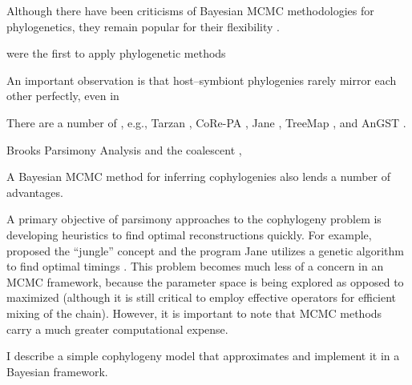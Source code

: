\documentclass[12pt,letterpaper]{article}
\begin{document}
Although there have been criticisms of Bayesian \ac{MCMC} methodologies \parencites{Felsenstein:2005}{Kolaczkowski:2009} for phylogenetics, they remain popular for their flexibility  \parencites{Huelsenbeck:2000}{Ronquist:2012}.

\textcite{Haffner:1988} were the first to apply phylogenetic methods  

An important observation is that host--symbiont phylogenies rarely mirror each other perfectly, even in 

There are a number of , e.g., Tarzan \parencite{Merkle:2005}, CoRe-PA \parencite{Merkle:2010}, Jane \parencite{Conow:2010}, TreeMap \parencite{Charleston:2011}, and AnGST \parencite{David:2011}.

Brooks Parsimony Analysis \parencite{Brooks:1981} and the coalescent \parencite{Rannala:2003} , 

A Bayesian \ac{MCMC} method for inferring cophylogenies also lends a number of advantages.

A primary objective of parsimony approaches to the cophylogeny problem is developing heuristics to find optimal reconstructions quickly. For example, \textcite{Charleston:1998} proposed the \enquote{jungle} concept and the program Jane utilizes a genetic algorithm to find optimal timings \parencite{Conow:2010}. This problem becomes much less of a concern in an \ac{MCMC} framework, because the parameter space is being explored as opposed to maximized (although it is still critical to employ effective operators for efficient mixing of the chain). However, it is important to note that \ac{MCMC} methods carry a much greater computational expense. 

I describe a simple cophylogeny model that approximates and implement it in a Bayesian framework. 
\end{document}
